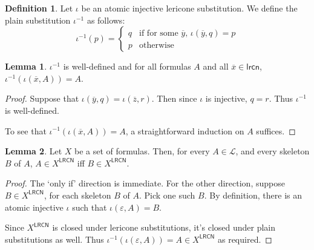 \documentclass{amsart}
\theoremstyle{definition}
\newtheorem{lemma}{Lemma}
\newtheorem{mdef}{Definition}
\newcommand{\LL}{\mathcal{L}}
\newcommand{\lrcn}{\mathsf{lrcn}}
\newcommand{\LRCN}{\mathsf{LRCN}}
\newcommand{\lrcnclose}[1]{#1^{\LRCN}}
\begin{document}
\begin{mdef}
    Let $\iota$ be an atomic injective lericone substitution. We define the plain substitution $\iota^{-1}$ as follows:
    \begin{displaymath}
        \iota^{-1}(p) =\left\{
            \begin{array}{rl}
                q   & \text{if for some $\overline{y}$, }\iota(\overline{y},q)=p \\
                p   & \text{otherwise}
            \end{array}\right.
    \end{displaymath}
\end{mdef}

\begin{lemma}
    $\iota^{-1}$ is well-defined and for all formulas $A$ and all $\overline{x}\in\lrcn$, $\iota^{-1}(\iota(\overline{x},A))=A$.
\end{lemma}
\begin{proof}
    Suppose that $\iota(\overline{y},q)=\iota(\overline{z},r)$. Then since $\iota$ is injective, $q=r$. Thus $\iota^{-1}$ is well-defined.

    To see that $\iota^{-1}(\iota(\overline{x},A))=A$, a straightforward induction on $A$ suffices.
\end{proof}

\begin{lemma}\label{lemma:any_skeleton}
    Let $X$ be a set of formulas. Then, for every $A\in\LL$, and every skeleton $B$ of $A$, $A\in\lrcnclose{X}$ iff $B\in\lrcnclose{X}$.
\end{lemma}
\begin{proof}
    The `only if' direction is immediate. For the other direction, suppose $B\in \lrcnclose{X}$, for each skeleton $B$ of $A$. Pick one such $B$. By definition, there is an atomic injective $\iota$ such that $\iota(\varepsilon,A)=B$. 

    Since $\lrcnclose{X}$ is closed under lericone substitutions, it's closed under plain substitutions as well. Thus $\iota^{-1}(\iota(\varepsilon,A))=A\in\lrcnclose{X}$ as required.
\end{proof}
\end{document}
